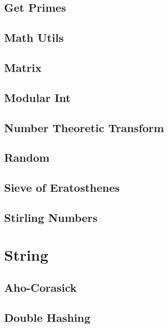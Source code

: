 \subsection{Get Primes}
\raggedbottom
\hrulefill
\subsection{Math Utils}
\raggedbottom
\hrulefill
\subsection{Matrix}
\raggedbottom
\hrulefill
\subsection{Modular Int}
\raggedbottom
\hrulefill
\subsection{Number Theoretic Transform}
\raggedbottom
\hrulefill
\subsection{Random}
\raggedbottom
\hrulefill
\subsection{Sieve of Eratosthenes}
\raggedbottom
\hrulefill
\subsection{Stirling Numbers}
\raggedbottom
\hrulefill

\section{String}
\subsection{Aho-Corasick}
\raggedbottom
\hrulefill
\subsection{Double Hashing}
\raggedbottom
\hrulefill
